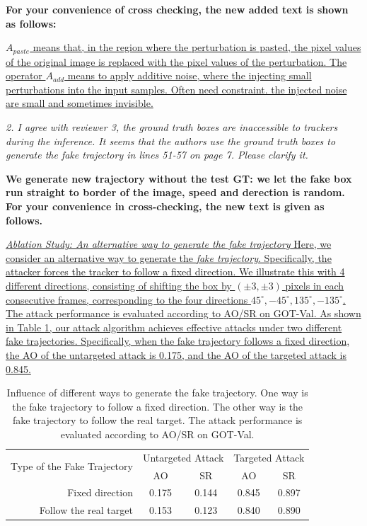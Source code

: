 \documentclass[12pt]{article}
\begin{document}
\textbf{For your convenience of cross checking, the new added text is shown as follows:}

\uline{
$A_{paste}$ means that, in the region where the perturbation is pasted, the pixel values of the original image is replaced with the pixel values of the perturbation.
The operator $A_{add}$ means to apply additive noise, where the injecting small perturbations into the input samples. Often need constraint. the injected noise are small and sometimes invisible.  
}


\textit{2. I agree with reviewer 3, the ground truth boxes are inaccessible to trackers during the inference. It seems that the authors use the ground truth boxes to generate the fake trajectory in lines 51-57 on page 7. Please clarify it.}

\textbf{We generate new trajectory without the test GT: we let the fake box run straight to border of the image, speed and derection is random. For your convenience in cross-checking, the new text is given as follows.}

\uline{
\textit{Ablation Study: An alternative way to generate the fake trajectory}  Here, we consider an alternative way to generate the \textit{fake trajectory}. Specifically, the attacker forces the tracker to follow a fixed direction. We illustrate this with 4 different directions, consisting of shifting the box by $(\pm 3, \pm 3)$ pixels in each consecutive frames, corresponding to the four directions $45^{\circ}, -45^{\circ}, 135^{\circ}, -135^{\circ}$.
The attack performance is evaluated according to AO/SR on GOT-Val.
As shown in Table \ref{table:direction}, our attack algorithm achieves effective attacks under two different fake trajectories. Specifically, when the fake trajectory follows a fixed direction, the AO of the untargeted attack is 0.175, and the AO of the targeted attack is 0.845.
}

\begin{table}[t]
  \centering
  \caption{Influence of different ways to generate the fake trajectory. One way is the fake trajectory to follow a fixed direction. The other way is the fake trajectory to follow the real target. The attack performance is evaluated according to AO/SR on GOT-Val.}
  \begin{tabular}{@{}rcccc@{}}
  \toprule
  \multirow{2}{*}[-2pt]{Type of the Fake Trajectory} & \multicolumn{2}{c}{Untargeted Attack} & \multicolumn{2}{c}{Targeted Attack} \\ \cmidrule{2-5}
                              & AO                & SR                & AO               & SR               \\ \midrule
  Fixed direction             & 0.175             & 0.144             & 0.845            & 0.897            \\
  Follow the real target      & 0.153             & 0.123             & 0.840            & 0.890            \\ \bottomrule        
  \end{tabular}
  \label{table:direction}
\end{table}
\end{document}
